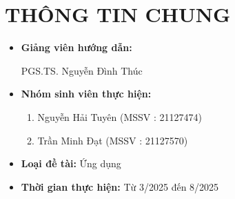 \documentclass{article}[14pt]
\begin{document}
\vspace{.5cm}

\Large
\section{THÔNG TIN CHUNG}
\begin{itemize}[label = {}]

    \item \textbf{Giảng viên hướng dẫn:}
          \begin{itemize}
              PGS.TS. Nguyễn Đình Thúc
          \end{itemize}{}


    \item \textbf{Nhóm sinh viên thực hiện:}

          \begin{enumerate}
              \item Nguyễn Hải Tuyên (MSSV : 21127474)
              \item Trần Minh Đạt (MSSV : 21127570)
          \end{enumerate}

    \item \textbf{Loại đề tài:} Ứng dụng

    \item \textbf{Thời gian thực hiện:} Từ 3/2025 đến 8/2025


\end{itemize}

\pagebreak
\end{document}
